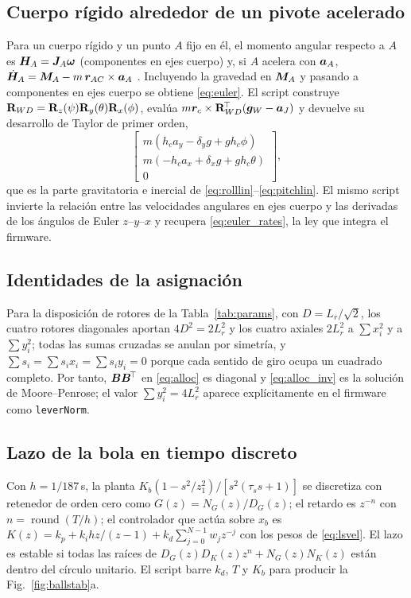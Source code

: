 \subsection{Cuerpo rígido alrededor de un pivote acelerado}
Para un cuerpo rígido y un punto $A$ fijo en él, el momento angular respecto a $A$ es $\bm{H}_A=\bm{J}_A\bm{\omega}$ (componentes en ejes cuerpo) y, si $A$ acelera con $\bm{a}_A$, $\dot{\bm{H}}_A=\bm{M}_A-m\,\bm{r}_{AC}\times\bm{a}_A$ \cite{ginsberg1998}. Incluyendo la gravedad en $\bm{M}_A$ y pasando a componentes en ejes cuerpo se obtiene \eqref{eq:euler}. El script  construye $\mathbf{R}_{WD}=\mathbf{R}_z(\psi)\mathbf{R}_y(\theta)\mathbf{R}_x(\phi)$, evalúa $m\bm{r}_c\times\mathbf{R}_{WD}^{\!\top}(\bm{g}_W-\bm{a}_J)$ y devuelve su desarrollo de Taylor de primer orden,
\begin{equation}
  \begin{bmatrix}m(h_ca_y-\delta_yg+gh_c\phi)\\ m(-h_ca_x+\delta_xg+gh_c\theta)\\ 0\end{bmatrix},
  \tag{A.3}
\end{equation}
que es la parte gravitatoria e inercial de \eqref{eq:rolllin}--\eqref{eq:pitchlin}. El mismo script invierte la relación entre las velocidades angulares en ejes cuerpo y las derivadas de los ángulos de Euler $z$--$y$--$x$ y recupera \eqref{eq:euler_rates}, la ley que integra el firmware.

\subsection{Identidades de la asignación}
Para la disposición de rotores de la Tabla~\ref{tab:params}, con $D=L_r/\sqrt2$, los cuatro rotores diagonales aportan $4D^2=2L_r^2$ y los cuatro axiales $2L_r^2$ a $\sum x_i^2$ y a $\sum y_i^2$; todas las sumas cruzadas se anulan por simetría, y $\sum s_i=\sum s_ix_i=\sum s_iy_i=0$ porque cada sentido de giro ocupa un cuadrado completo. Por tanto, $\bm{B}\bm{B}^{\!\top}$ en \eqref{eq:alloc} es diagonal y \eqref{eq:alloc_inv} es la solución de Moore--Penrose; el valor $\sum y_i^2=4L_r^2$ aparece explícitamente en el firmware como \texttt{leverNorm}.

\subsection{Lazo de la bola en tiempo discreto}
Con $h=1/187$\,s, la planta $K_b(1-s^2/z_1^2)/[s^2(\tau_ss+1)]$ se discretiza con retenedor de orden cero como $G(z)=N_G(z)/D_G(z)$; el retardo es $z^{-n}$ con $n=\operatorname{round}(T/h)$; el controlador que actúa sobre $x_b$ es $K(z)=k_p+k_ihz/(z-1)+k_d\sum_{j=0}^{N-1}w_jz^{-j}$ con los pesos de \eqref{eq:lsvel}. El lazo es estable si todas las raíces de $D_G(z)D_K(z)z^{n}+N_G(z)N_K(z)$ están dentro del círculo unitario. El script  barre $k_d$, $T$ y $K_b$ para producir la Fig.~\ref{fig:ballstab}a.

